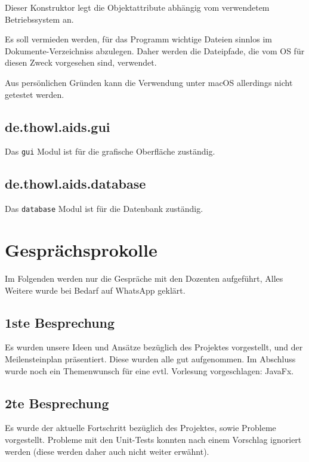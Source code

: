 \documentclass[stu, a4paper, 11pt, floatsintext]{apa7}
\begin{document}
\noindent Dieser Konstruktor legt die Objektattribute abhängig vom verwendetem Betriebssystem an.

Es soll vermieden werden, für das Programm wichtige Dateien sinnlos im Dokumente-Verzeichniss abzulegen. Daher werden die Dateipfade, die vom OS für diesen Zweck vorgesehen sind, verwendet.

Aus persönlichen Gründen kann die Verwendung unter macOS allerdings nicht getestet werden.

\subsection{de.thowl.aids.gui}
\noindent Das \texttt{gui} Modul ist für die grafische Oberfläche zuständig.

\subsection{de.thowl.aids.database}
\noindent Das \texttt{database} Modul ist für die Datenbank zuständig.

\clearpage

\section{Gesprächsprokolle}

\noindent Im Folgenden werden nur die Gespräche mit den Dozenten aufgeführt,
Alles Weitere wurde bei Bedarf auf WhatsApp geklärt.

\subsection{1ste Besprechung}

\noindent Es wurden unsere Ideen und Ansätze bezüglich des Projektes vorgestellt,
und der Meilensteinplan präsentiert.
Diese wurden alle gut aufgenommen.
Im Abschluss wurde noch ein Themenwunsch für eine evtl. Vorlesung vorgeschlagen: JavaFx.

\subsection{2te Besprechung}

\noindent Es wurde der aktuelle Fortschritt bezüglich des Projektes, sowie Probleme vorgestellt.
Probleme mit den Unit-Tests konnten nach einem Vorschlag ignoriert werden (diese werden daher auch nicht weiter erwähnt).

\clearpage
\end{document}
